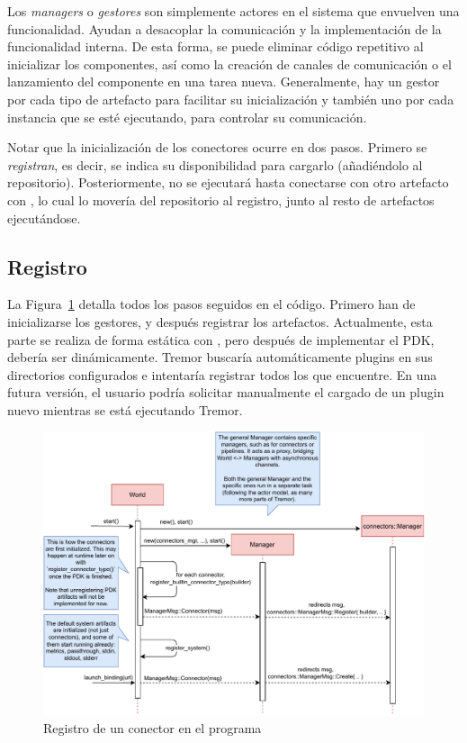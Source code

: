 Los \emph{managers} o \emph{gestores} son simplemente actores en el sistema que
envuelven una funcionalidad. Ayudan a desacoplar la comunicación y la
implementación de la funcionalidad interna. De esta forma, se puede eliminar
código repetitivo al inicializar los componentes, así como la creación de
canales de comunicación o el lanzamiento del componente en una tarea nueva.
Generalmente, hay un gestor por cada tipo de artefacto para facilitar su
inicialización y también uno por cada instancia que se esté ejecutando, para
controlar su comunicación.

Notar que la inicialización de los conectores ocurre en dos pasos. Primero se
\emph{registran}, es decir, se indica su disponibilidad para cargarlo
(añadiéndolo al repositorio). Posteriormente, no se ejecutará hasta conectarse
con otro artefacto con , lo cual lo movería del repositorio
al registro, junto al resto de artefactos ejecutándose.

\subsection{Registro}

La Figura~\ref{fig:tremor_registering} detalla todos los pasos seguidos en el
código. Primero han de inicializarse los gestores, y después registrar los
artefactos. Actualmente, esta parte se realiza de forma estática con
, pero después de implementar el PDK, debería ser
dinámicamente. Tremor buscaría automáticamente plugins en sus directorios
configurados e intentaría registrar todos los que encuentre. En una futura
versión, el usuario podría solicitar manualmente el cargado de un plugin nuevo
mientras se está ejecutando Tremor.

\begin{figure}
    \centering
    \includegraphics[width=\textwidth]{./Imagenes/registering.pdf}
    \caption{Registro de un conector en el programa}%
    \label{fig:tremor_registering}
\end{figure}

